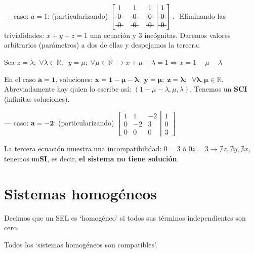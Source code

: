 \begin{ejem}
 --- caso: $a=1$: (particularizando) $\left[ \begin{matrix}
 1 & 1 & 1 \\  \text{\textst{ 0 }} &  \text{\textst{ 0 }} &  \text{\textst{ 0 }} \\  \text{\textst{ 0 }} &  \text{\textst{ 0 }} &  \text{\textst{ 0 }}
 \end{matrix}\right. 
 \left| \begin{matrix}
  1 \\  \text{\textst{ 0 }} \\  \text{\textst{ 0 }} 
 \end{matrix}\right].\;$ Eliminando las trivialidades: $x+y+z=1$ una ecuación y 3 incógnitas. Daremos valores arbitrarios (parámetros) a dos de ellas y despejamos la tercera:
 
 Sea $z=\lambda; \; \forall \lambda \in \mathbb R; \; \; y=\mu; \; \forall \mu \in \mathbb R\; \to x+\mu+\lambda=1 \Rightarrow x=1-\mu-\lambda$
 
 En el caso $\boldsymbol{a=1}$, soluciones: $\boldsymbol{x=1-\mu-\lambda; \; y=\mu; \; z=\lambda; \; \; \forall \lambda, \mu \in \mathbb R}$. Abreviadamente hay quien lo escribe así: $(1-\mu-\lambda, \mu, \lambda)$. Tenemos un \textbf{SCI} (infinitas soluciones).
 
 --- caso: $\boldsymbol{a=-2}$: (particularizando) $\left[ \begin{matrix}
 1 & 1 & -2 \\ 0 & -2 & 3 \\ 0 & 0 & 0
 \end{matrix}\right. 
 \left| \begin{matrix}
  1 \\ 0 \\ 3 
 \end{matrix}\right]\; $ 
 
 La tercera ecuación muestra una incompatibilidad: $0=3$ ó $0z=3 \to \nexists z, \nexists y, \nexists x$, tenemos un\textbf{SI}, es decir, \textbf{el sistema no tiene solución}.
 
\end{ejem}



\section{Sistemas homogéneos}

\begin{defi}
Decimos que un SEL es `homogéneo' si todos sus términos independientes son cero.


	
\end{defi}
\begin{teor}Todos los `sistemas homogéneos son compatibles'.	
\end{teor}

